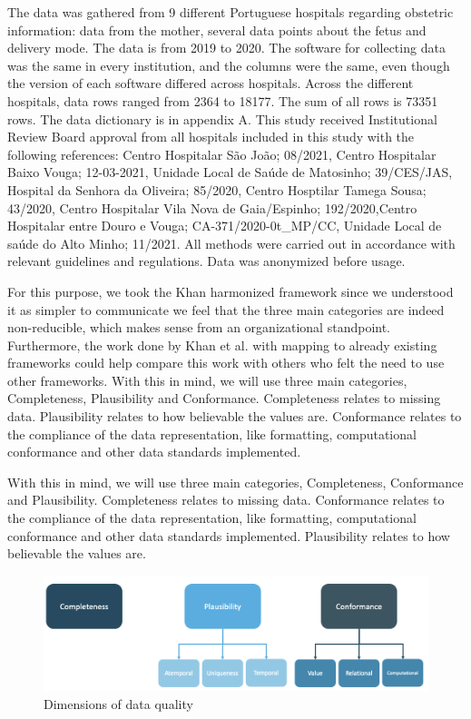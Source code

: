The data was gathered from 9 different Portuguese hospitals regarding obstetric information: data from the mother, several data points about the fetus and delivery mode. The data is from 2019 to 2020. The software for collecting data was the same in every institution, and the columns were the same, even though the version of each software differed across hospitals. Across the different hospitals, data rows ranged from 2364 to 18177. The sum of all rows is 73351 rows. The data dictionary is in appendix A. This study received Institutional Review Board approval from all hospitals included in this study with the following references: Centro Hospitalar São João; 08/2021, Centro Hospitalar Baixo Vouga; 12-03-2021, Unidade Local de Saúde de Matosinho; 39/CES/JAS, Hospital da Senhora da Oliveira; 85/2020, Centro Hosptilar Tamega Sousa; 43/2020, Centro Hospitalar Vila Nova de Gaia/Espinho; 192/2020,Centro Hospitalar entre Douro e Vouga; CA-371/2020-0t\_MP/CC, Unidade Local de sa\'{u}de do Alto Minho; 11/2021. All methods were carried out in accordance with relevant guidelines and regulations. Data was anonymized before usage.

For this purpose, we took the Khan harmonized framework since we understood it as simpler to communicate we feel that the three main categories are indeed non-reducible, which makes sense from an organizational standpoint. Furthermore, the work done by Khan et al. with mapping to already existing frameworks could help compare this work with others who felt the need to use other frameworks. With this in mind, we will use three main categories, Completeness, Plausibility and Conformance. Completeness relates to missing data. Plausibility relates to how believable the values are. Conformance relates to the compliance of the data representation, like formatting, computational conformance and other data standards implemented. 

With this in mind, we will use three main categories, Completeness, Conformance and Plausibility. Completeness relates to missing data. Conformance relates to the compliance of the data representation, like formatting, computational conformance and other data standards implemented. Plausibility relates to how believable the values are.

\begin{figure}[htbp]
\centering
\caption{Dimensions of data quality}\label{fig:categories} 
\includegraphics[scale=0.29]{imgs/data-quality-v1.png}
\end{figure}
